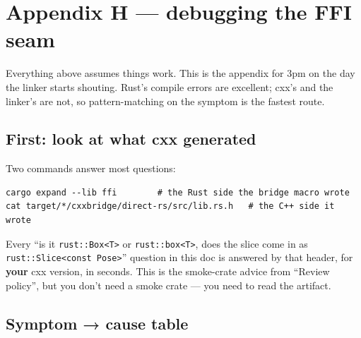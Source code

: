 \documentclass[11pt]{article}
\begin{document}
\section{Appendix H — debugging the FFI seam}
\label{sec:orgb59663d}

Everything above assumes things work. This is the appendix for 3pm on the day
the linker starts shouting. Rust's compile errors are excellent; cxx's and the
linker's are not, so pattern-matching on the symptom is the fastest route.
\subsection{First: look at what cxx generated}
\label{sec:org5eb6b3a}

Two commands answer most questions:

\begin{verbatim}
cargo expand --lib ffi        # the Rust side the bridge macro wrote
cat target/*/cxxbridge/direct-rs/src/lib.rs.h   # the C++ side it wrote
\end{verbatim}

Every ``is it \texttt{rust::Box<T>} or \texttt{rust::box<T>}, does the slice come in as
\texttt{rust::Slice<const Pose>}'' question in this doc is answered by that header, for
\textbf{your} cxx version, in seconds. This is the smoke-crate advice from ``Review
policy'', but you don't need a smoke crate — you need to read the artifact.
\subsection{Symptom → cause table}
\label{sec:org24fba6e}
\end{document}
